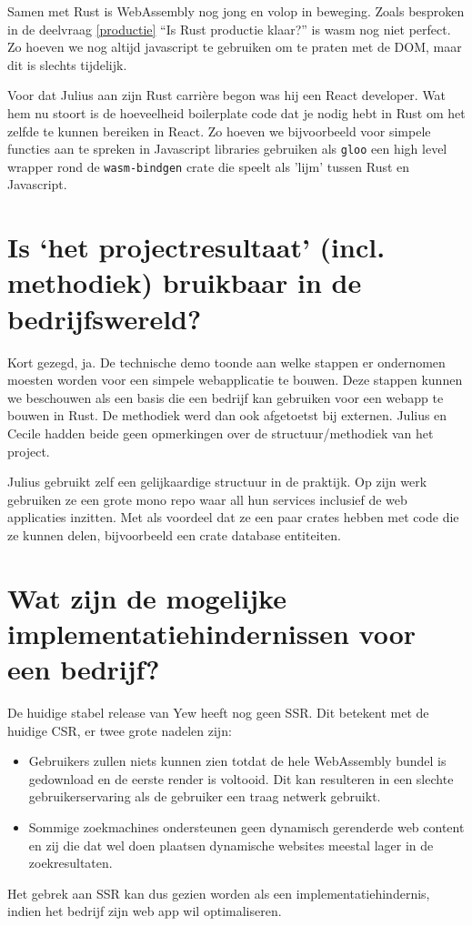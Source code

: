 Samen met Rust is WebAssembly nog jong en volop in beweging. Zoals besproken in de deelvraag
\ref{productie} \enquote{Is Rust productie klaar?} is wasm nog niet perfect. Zo hoeven we nog altijd
javascript te gebruiken om te praten met de DOM, maar dit is slechts tijdelijk.

Voor dat Julius aan zijn Rust carrière begon was hij een React developer. Wat hem nu stoort is de
hoeveelheid boilerplate code dat je nodig hebt in Rust om het zelfde te kunnen bereiken in React.
Zo hoeven we bijvoorbeeld voor simpele functies aan te spreken in Javascript libraries gebruiken als
\texttt{gloo} een high level wrapper rond de \texttt{wasm-bindgen} crate die
speelt als 'lijm' tussen Rust en Javascript.

\clearpage

\section{Is ‘het projectresultaat’ (incl. methodiek) bruikbaar in de bedrijfswereld?}

Kort gezegd, ja. De technische demo toonde aan welke stappen er ondernomen moesten worden voor een
simpele webapplicatie te bouwen. Deze stappen kunnen we beschouwen als een basis die een bedrijf kan
gebruiken voor een webapp te bouwen in Rust. De methodiek werd dan ook afgetoetst bij externen.
Julius en Cecile hadden beide geen opmerkingen over de structuur/methodiek van het project. 

Julius gebruikt zelf een gelijkaardige structuur in de praktijk. Op zijn werk gebruiken ze een grote
mono repo waar all hun services inclusief de web applicaties inzitten. Met als voordeel dat ze een
paar crates hebben met code die ze kunnen delen, bijvoorbeeld een crate database entiteiten.

\section{Wat zijn de mogelijke implementatiehindernissen voor een bedrijf?}

De huidige stabel release van Yew heeft nog geen SSR. Dit betekent met de huidige CSR, er twee grote
nadelen zijn:
\begin{itemize}
   \item Gebruikers zullen niets kunnen zien totdat de hele WebAssembly bundel is gedownload en de
   eerste render is voltooid. Dit kan resulteren in een slechte gebruikerservaring als de gebruiker
   een traag netwerk gebruikt.

  \item Sommige zoekmachines ondersteunen geen dynamisch gerenderde web content en zij die dat wel
  doen plaatsen dynamische websites meestal lager in de zoekresultaten.
\end{itemize}
Het gebrek aan SSR kan dus gezien worden als een implementatiehindernis, indien het bedrijf zijn web
app wil optimaliseren.

